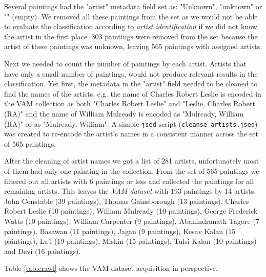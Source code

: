 \documentclass[11pt,a4paper,twoside,openright]{report}
\begin{document}
Several paintings had the "artist" metadata field set as: "Unknown", "unknown"
or "" (empty).  We removed all these paintings from the set as we would not be
able to evaluate the classification according to \emph{artist identification}
if we did not know the artist in the first place.  303 paintings were removed
from the set because the artist of these paintings was unknown, leaving 565
paintings with assigned artists.

Next we needed to count the number of paintings by each artist.  Artists that
have only a small number of paintings, would not produce relevant results in
the classification.  Yet first, the metadata in the "artist" field needed to be
cleaned to find the names of the artists.  e.g. the name of Charles Robert
Leslie is encoded in the VAM collection as both "Charles Robert Leslie" and
"Leslie, Charles Robert (RA)" and the name of William Mulready is encoded as
"Mulready, William (RA)" or as "Mulready, William".  A simple \texttt{jsed}
script (\texttt{cleanse-artists.jsed}) was created to re-encode the artist's
names in a consistent manner across the set of 565 paintings.

After the cleaning of artist names we got a list of 281 artists, unfortunately
most of them had only one painting in the collection.  From the set of 565
paintings we filtered out all artists with 6 paintings or less and collected
the paintings for all remaining artists.  This leaves the \emph{VAM dataset}
with 193 paintings by 14 artists: John Constable (39 paintings), Thomas
Gainsborough (13 paintings), Charles Robert Leslie (10 paintings), William
Mulready (10 paintings), George Frederick Watts (10 paintings), William
Carpenter (9 paintings), Abanindranath Tagore (7 paintings), Basawan (11
paintings), Jagan (9 paintings), Kesav Kalan (15 paintings), La'l (19
paintings), Miskin (15 paintings), Tulsi Kalan (10 paintings) and Devi (16
paintings).

Table \ref{tab:crawl} shows the VAM dataset acquisition in perspective.
\end{document}
